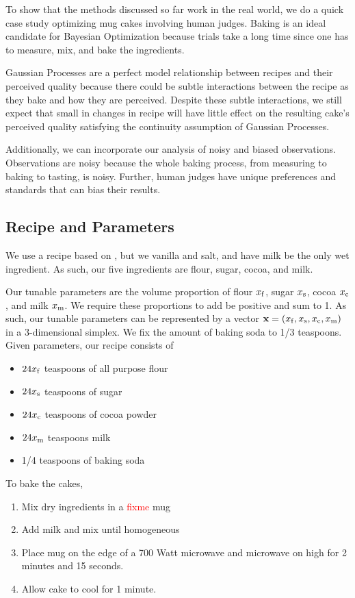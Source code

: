 
To show that the methods discussed so far work in the real world, we do a quick case study optimizing mug cakes involving human judges.
Baking is an ideal candidate for Bayesian Optimization because trials take a long time since one has to measure, mix, and bake the ingredients.

Gaussian Processes are a perfect model relationship between recipes and their perceived quality because there could be subtle interactions between the recipe as they bake and how they are perceived.
Despite these subtle interactions, we still expect that small in changes in recipe will have little effect on the resulting cake's perceived quality satisfying the continuity assumption of Gaussian Processes.

Additionally, we can incorporate our analysis of noisy and biased observations.
Observations are noisy because the whole baking process, from measuring to baking to tasting, is noisy.
Further, human judges have unique preferences and standards that can bias their results.

\subsection{Recipe and Parameters}

We use a recipe based on \cite{mugcake}, but we vanilla and salt, and have milk be the only wet ingredient.
As such, our five ingredients are flour, sugar, cocoa, and milk.

Our tunable parameters are the volume proportion of flour $x_\ff$, sugar $x_\ss$, cocoa $x_\cc$, and milk $x_\mm$.
We require these proportions to add be positive and sum to 1.
As such, our tunable parameters can be represented by a vector $\mathbf{x} = (x_\ff, x_\ss, x_\cc,x_\mm)$ in a 3-dimensional simplex.
We fix the amount of baking soda to 1/3 teaspoons.
Given parameters, our recipe consists of
\begin{itemize}
    \item $24x_\ff$ teaspoons of all purpose flour
    \item $24x_\ss$ teaspoons of sugar
    \item $24x_\cc$ teaspoons of cocoa powder
    \item $24x_\mm$ teaspoons milk
    \item 1/4 teaspoons of baking soda
\end{itemize}
To bake the cakes,
\begin{enumerate}
    \item Mix dry ingredients in a \textcolor{red}{fixme} mug
    \item Add milk and mix until homogeneous
    \item Place mug on the edge of a 700 Watt microwave and microwave on high for 2 minutes and 15 seconds.
    \item Allow cake to cool for 1 minute.
\end{enumerate}

